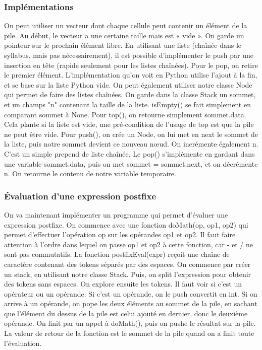 \documentclass[10pt]{article}
\begin{document}
\subsubsection{Implémentations}
On peut utiliser un vecteur dont chaque cellule peut contenir un élément de la pile. Au début, le vecteur a une certaine taille mais est « vide ». On garde un pointeur sur le prochain élément libre. 
\newline \newline 
En utilisant une liste (chaînée dans le syllabus, mais pas nécessairement), il est possible d'implémenter le push par une insertion en tête (rapide seulement pour les listes chaînées). Pour le pop, on retire le premier élément. L'implémentation qu'on voit en Python utilise l'ajout à la fin, et se base sur la liste Python vide. 
\newline \newline 
On peut également utiliser notre classe Node qui permet de faire des listes chaînées. On garde dans la classe Stack un sommet, et un champs "n" contenant la taille de la liste. isEmpty() se fait simplement en comparant sommet à None. Pour top(), on retourne simplement sommet.data. Cela plante si la liste est vide, une pré-condition de l'usage de top est que la pile ne peut être vide.  
\newline \newline 
Pour push(), on crée un Node, on lui met en next le sommet de la liste, puis notre sommet devient ce nouveau nœud. On incrémente également n. C'est un simple prepend de liste chaînée. Le pop() s'implémente en gardant dans une variable sommet.data, puis on met sommet = sommet.next, et on décrémente n. On retourne le contenu de notre variable temporaire.
\subsubsection{Évaluation d'une expression postfixe}
On va maintenant implémenter un programme qui permet d'évaluer une expression postfixe. On commence avec une fonction doMath(op, op1, op2) qui permet d'effectuer l'opération op sur les opérandes op1 et op2. Il faut faire attention à l'ordre dans lequel on passe op1 et op2 à cette fonction, car - et / ne sont pas commutatifs. 
\newline \newline 
La fonction postfixEval(expr) reçoit une chaîne de caractère contenant des tokens séparés par des espaces. On commence par créer un stack, en utilisant notre classe Stack. Puis, on split l'expression pour obtenir des tokens sans espaces. On explore ensuite les tokens. Il faut voir si c'est un opérateur ou un opérande. Si c'est un opérande, on le push convertit en int. Si on arrive à un opérande, on pope les deux éléments au sommet de la pile, en sachant que l'élément du dessus de la pile est celui ajouté en dernier, donc le deuxième opérande. On finit par un appel à doMath(), puis on pushe le résultat sur la pile. 
\newline \newline 
La valeur de retour de la fonction est le sommet de la pile quand on a finit toute l'évaluation.
\end{document}
